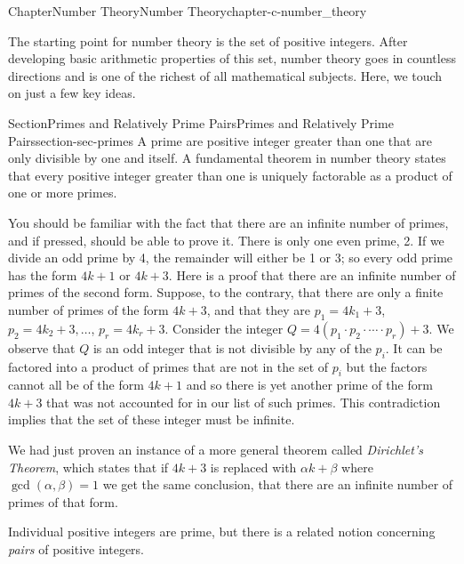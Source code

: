 \documentclass[oneside,10pt,]{book}
\numberwithin{equation}{section}
\begin{document}
\begin{chapterptx}{Chapter}{Number Theory}{}{Number Theory}{}{}{chapter-c-number_theory}
\renewcommand*{\chaptername}{Chapter}
\begin{introduction}{}%
The starting point for number theory is the set of positive integers.  After developing basic arithmetic properties of this set, number theory goes in countless directions and is one of the richest of all mathematical subjects. Here, we touch on just a few key ideas.%
\end{introduction}%
%
%
\typeout{************************************************}
\typeout{************************************************}
%
\begin{sectionptx}{Section}{Primes and Relatively Prime Pairs}{}{Primes and Relatively Prime Pairs}{}{}{section-sec-primes}
A prime are positive integer greater than one that are only divisible by one and itself. A fundamental theorem in number theory states that every positive integer greater than one is uniquely factorable as a product of one or more primes.%
\par
You should be familiar with the fact that there are an infinite number of primes, and if pressed, should be able to prove it.  There is only one even prime, 2. If we divide an odd prime by 4, the remainder will either be 1 or 3; so every odd prime has the form \(4k+1\) or \(4k+3\).  Here is a proof that there are an infinite number of primes of the second form. Suppose, to the contrary, that there are only a finite number of primes of the form \(4k+3\), and that they are  \(p_1=4k_1+3\), \(p_2=4k_2+3, \dots\), \(p_r=4k_r+3\).  Consider the integer \(Q= 4(p_1 \cdot p_2 \cdot \cdots \cdot p_r)+3\).  We observe that \(Q\) is an odd integer that is not divisible by any of the \(p_i\). It can be factored into a product of primes that are not in the set of \(p_i\) but the factors cannot all be of the form \(4k+1\) and so there is yet another prime of the form \(4k+3\) that was not accounted for in our list of such primes.  This contradiction implies that the set of these integer must be infinite.%
\par
We had just proven an instance of a more general theorem called \emph{Dirichlet's Theorem}, which states that if \(4k+3\) is replaced with \(\alpha k + \beta\) where \(\gcd(\alpha,\beta)=1\) we get the same conclusion, that there are an infinite number of primes of that form.%
\par
Individual positive integers are prime, but there is a related notion concerning \emph{pairs} of positive integers.%

\end{sectionptx}
\end{chapterptx}
\end{document}

